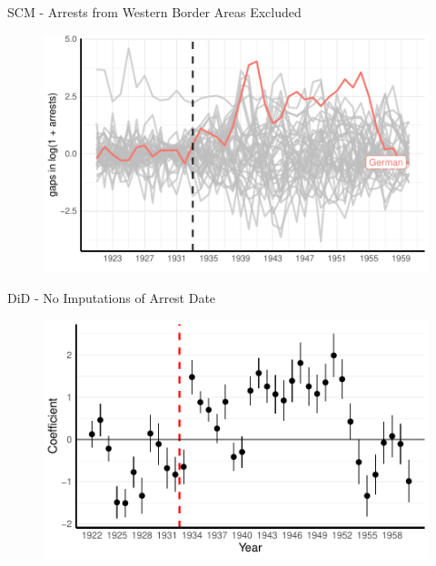 \documentclass[11pt]{beamer}
\begin{document}
\begin{frame}[label=sc_non_border_area_west]{SCM - Arrests from Western Border Areas Excluded}
 \begin{figure}[h]
\centering
\includegraphics[width=1\textwidth]{placebo_highlight_all_non_border_provinces_western.pdf}
\end{figure}
\hyperlink{add_content}{}
\end{frame}


\begin{frame}[label=did_no_date_imputation]{DiD - No Imputations of Arrest Date}
 \begin{figure}[h]
\centering
\includegraphics[width=1\textwidth]{pr_cr2_fmla_pred_full_no_trends_geopol.pdf}
\end{figure}
\hyperlink{add_content}{}
\end{frame}
\end{document}
